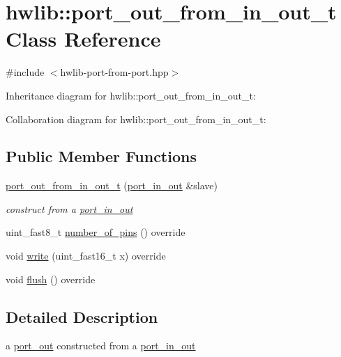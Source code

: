 \hypertarget{classhwlib_1_1port__out__from__in__out__t}{}\section{hwlib\+:\+:port\+\_\+out\+\_\+from\+\_\+in\+\_\+out\+\_\+t Class Reference}
\label{classhwlib_1_1port__out__from__in__out__t}


{\ttfamily \#include $<$hwlib-\/port-\/from-\/port.\+hpp$>$}



Inheritance diagram for hwlib\+:\+:port\+\_\+out\+\_\+from\+\_\+in\+\_\+out\+\_\+t\+:


Collaboration diagram for hwlib\+:\+:port\+\_\+out\+\_\+from\+\_\+in\+\_\+out\+\_\+t\+:
\subsection*{Public Member Functions}
\begin{DoxyCompactItemize}
\item 
\mbox{\label{classhwlib_1_1port__out__from__in__out__t_a8530be4f7d1450ffd3d79051e20bf2e0}} 
\hyperlink{classhwlib_1_1port__out__from__in__out__t_a8530be4f7d1450ffd3d79051e20bf2e0}{port\+\_\+out\+\_\+from\+\_\+in\+\_\+out\+\_\+t} (\hyperlink{classhwlib_1_1port__in__out}{port\+\_\+in\+\_\+out} \&slave)
\begin{DoxyCompactList}\small\item\em construct from a \hyperlink{classhwlib_1_1port__in__out}{port\+\_\+in\+\_\+out} \end{DoxyCompactList}\item 
uint\+\_\+fast8\+\_\+t \hyperlink{classhwlib_1_1port__out__from__in__out__t_a0daa8725e2de27b9071505fa198b4b78}{number\+\_\+of\+\_\+pins} () override
\item 
void \hyperlink{classhwlib_1_1port__out__from__in__out__t_acc2b58e61226bcf46f7f4c30c94084ee}{write} (uint\+\_\+fast16\+\_\+t x) override
\item 
void \hyperlink{classhwlib_1_1port__out__from__in__out__t_a568ad753e6063bca9ecea4afe5d941b2}{flush} () override
\end{DoxyCompactItemize}


\subsection{Detailed Description}
a \hyperlink{classhwlib_1_1port__out}{port\+\_\+out} constructed from a \hyperlink{classhwlib_1_1port__in__out}{port\+\_\+in\+\_\+out}

